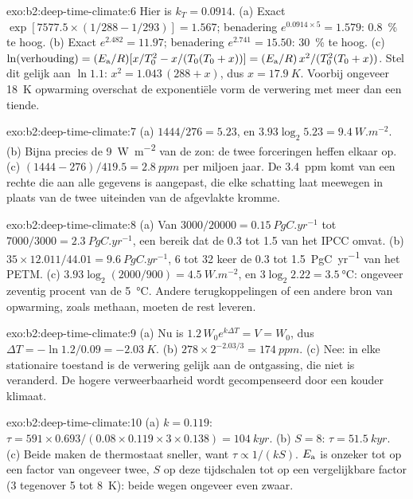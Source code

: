 \begin{solution}{exo:b2:deep-time-climate:6}
Hier is $k_T = 0.0914$. (a) Exact $\exp[7577.5\times(1/288 - 1/293)] = 1.567$; benadering
$e^{0.0914\times5} = 1.579$: \qty{0.8}{\percent} te hoog. (b) Exact $e^{2.482} = 11.97$;
benadering $e^{2.741} = 15.50$: \qty{30}{\percent} te hoog. (c) $\ln(\text{verhouding}) = (E_{\text
a}/R)[x/T_0^2 - x/(T_0(T_0 + x))] = (E_{\text a}/R)\,x^2/(T_0^2(T_0 + x))$. Stel dit gelijk aan $\ln1.1$:
$x^2 = 1.043\,(288 + x)$, dus $x = \qty{17.9}{K}$. Voorbij ongeveer \qty{18}{K} opwarming
overschat de exponentiële vorm de verwering met meer dan een tiende.
\end{solution}

\begin{solution}{exo:b2:deep-time-climate:7}
(a) $1444/276 = 5.23$, en $3.93\log_2 5.23 = \qty{9.4}{W.m^{-2}}$. (b) Bijna precies de
\qty{9}{W.m^{-2}} van de zon: de twee forceringen heffen elkaar op. (c) $(1444 - 276)/419.5 =
\qty{2.8}{ppm}$ per miljoen jaar. De \qty{3.4}{ppm} komt van een rechte die aan alle
gegevens is aangepast, die elke schatting laat meewegen in plaats van de twee uiteinden van de afgevlakte kromme.
\end{solution}

\begin{solution}{exo:b2:deep-time-climate:8}
(a) Van $3000/20000 = \qty{0.15}{PgC.yr^{-1}}$ tot $7000/3000 = \qty{2.3}{PgC.yr^{-1}}$, een bereik
dat de 0.3 tot 1.5 van het IPCC omvat. (b) $35\times12.011/44.01 = \qty{9.6}{PgC.yr^{-1}}$, 6 tot
32 keer de 0.3 tot \qty{1.5}{PgC.yr^{-1}} van het PETM. (c) $3.93\log_2(2000/900) = \qty{4.5}{W.m^{-2}}$,
en $3\log_2 2.22 = \qty{3.5}{\celsius}$: ongeveer zeventig procent van de \qty{5}{\celsius}. Andere
terugkoppelingen of een andere bron van opwarming, zoals methaan, moeten de rest leveren.
\end{solution}

\begin{solution}{exo:b2:deep-time-climate:9}
(a) Nu is $1.2\,W_0e^{k\Delta T} = V = W_0$, dus $\Delta T = -\ln 1.2/0.09 = \qty{-2.03}{K}$.
(b) $278\times2^{-2.03/3} = \qty{174}{ppm}$. (c) Nee: in elke stationaire toestand is de verwering gelijk aan de
ontgassing, die niet is veranderd. De hogere verweerbaarheid wordt gecompenseerd door een kouder klimaat.
\end{solution}

\begin{solution}{exo:b2:deep-time-climate:10}
(a) $k = 0.119$: $\tau = 591\times0.693/(0.08\times0.119\times3\times0.138) = \qty{104}{kyr}$.
(b) $S = 8$: $\tau = \qty{51.5}{kyr}$. (c) Beide maken de thermostaat sneller, want $\tau \propto
1/(kS)$. $E_{\text a}$ is onzeker tot op een factor van ongeveer twee, $S$ op deze tijdschalen tot op een
vergelijkbare factor (3 tegenover 5 tot \qty{8}{K}): beide wegen ongeveer even zwaar.
\end{solution}

